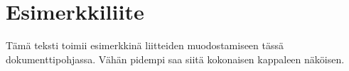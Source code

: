 \chapter{Esimerkkiliite}%
\label{ch:liite}

Tämä teksti toimii esimerkkinä liitteiden muodostamiseen tässä dokumenttipohjassa. Vähän pidempi saa siitä kokonaisen kappaleen näköisen.
